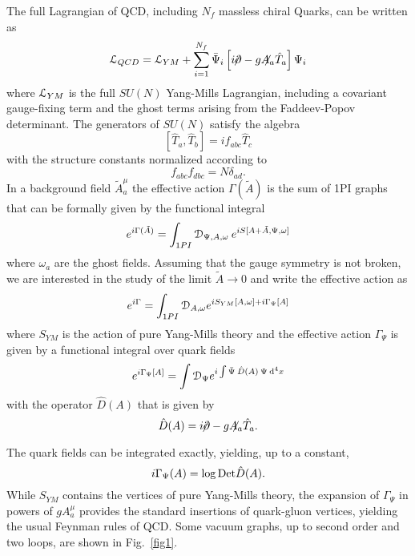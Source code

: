 \documentclass[aps,preprint]{revtex4}
\newcommand{\BE}{\begin{equation}}
\newcommand{\EE}{\end{equation}}
\newcommand{\fsl}[1]{\ensuremath{\mathrlap{\!\not{\phantom{#1}}}#1}}
\begin{document}
The full Lagrangian of QCD, including $N_f$ massless chiral Quarks, can be written as
\BE
{\cal L}_{QCD}={\cal L}_{YM}+\sum_{i=1}^{N_f}
\bar\Psi_i\left[i\fsl{\partial}-g{\ensuremath{\mathrlap{\>\not{\phantom{A}}}A_a}}\hat T_a\right]\Psi_i
\label{LQCD}
\EE
where ${\cal L}_{YM}$ is the full $SU(N)$ Yang-Mills Lagrangian, including a covariant gauge-fixing term
and the ghost terms arising from the Faddeev-Popov determinant.
The generators of $SU(N)$ satisfy the algebra
\BE
\left[ \hat T_a, \hat T_b\right]= i f_{abc} \hat T_c
\EE
with the structure constants normalized according to
\BE
f_{abc} f_{dbc}= N\delta_{ad}.
\label{ff}
\EE
In a background field $\tilde A_a^\mu$ the effective action $\Gamma (\tilde A)$ is the sum of 1PI graphs
that can be formally given by the functional integral
\BE
e^{i\Gamma( \tilde A)}=\int_{1PI} {\cal D}_{\Psi, A, \omega}\> e^{i S[A+\tilde A, \Psi, \omega]}
\EE
where $\omega_a$ are the ghost fields.
Assuming that the gauge symmetry is not broken, we are interested in the study of the limit $\tilde A\to 0$ and 
write the effective action as
\BE
e^{i\Gamma}=\int_{1PI} {\cal D}_{ A, \omega} e^{i S_{YM} [A, \omega] +i\Gamma_\Psi[A]}
\EE
where $S_{YM}$ is the action of pure Yang-Mills theory and the effective action $\Gamma_\Psi$ 
is given by a functional integral over quark fields
\BE
e^{i\Gamma_\Psi[A]}=\int {\cal D}_{ \Psi} e^{i \int \bar \Psi \>\hat D(A)\> \Psi \>{\rm d}^4x}
\EE
with the operator $\hat D(A)$ that is given by
\BE
\hat D(A)=i\fsl{\partial}-g{\ensuremath{\mathrlap{\>\not{\phantom{A}}}A_a}}\hat T_a.
\EE

The quark fields can be integrated exactly, yielding, up to a constant,
\BE
i\Gamma_\Psi(A)=\log {\rm Det}\hat D(A).
\label{GammaPsi}
\EE
While $S_{YM}$ contains the vertices of pure Yang-Mills theory, the expansion of $\Gamma_\Psi$ in
powers of $gA_a^\mu$ provides the standard insertions of quark-gluon vertices, yielding the usual
Feynman rules of QCD. Some vacuum graphs, up to second order and two loops, are shown in Fig.~\ref{fig1}.
\end{document}
